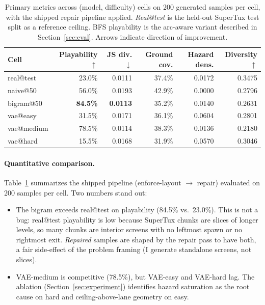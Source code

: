 \documentclass[11pt]{article}
\begin{document}
\begin{table}[h]
\centering
\small
\caption{Primary metrics across (model, difficulty) cells on 200
generated samples per cell, with the shipped repair pipeline applied.
\emph{Real@test} is the held-out SuperTux test split as a reference
ceiling. BFS playability is the arc-aware variant described in
Section~\ref{sec:eval}. Arrows indicate direction of improvement.}
\label{tab:main}
\begin{tabular}{lrrrrr}
\toprule
\textbf{Cell} & \textbf{Playability} $\uparrow$ & \textbf{JS div.} $\downarrow$ & \textbf{Ground cov.} & \textbf{Hazard dens.} & \textbf{Diversity} $\uparrow$ \\
\midrule
real@test   & 23.0\% & 0.0111 & 37.4\% & 0.0172 & 0.3475 \\
\midrule
naive@50    & 56.0\% & 0.0193 & 42.9\% & 0.0000 & 0.2796 \\
bigram@50   & \textbf{84.5\%} & \textbf{0.0113} & 35.2\% & 0.0140 & 0.2631 \\
vae@easy    & 31.5\% & 0.0171 & 36.1\% & 0.0604 & 0.2801 \\
vae@medium  & 78.5\% & 0.0114 & 38.3\% & 0.0136 & 0.2180 \\
vae@hard    & 15.5\% & 0.0168 & 31.9\% & 0.0570 & 0.3046 \\
\bottomrule
\end{tabular}
\end{table}

\paragraph{Quantitative comparison.}
Table~\ref{tab:main} summarizes the shipped pipeline (enforce-layout
$\to$ repair) evaluated on 200 samples per cell. Two numbers stand
out:
\begin{itemize}
    \item The bigram exceeds real@test on playability (84.5\% vs.\
    23.0\%). This is not a bug: real@test playability is low because
    SuperTux chunks are slices of longer levels, so many chunks are
    interior screens with no leftmost spawn or no rightmost exit.
    \emph{Repaired} samples are shaped by the repair pass to have
    both, a fair side-effect of the problem framing (I generate
    standalone screens, not slices).
    \item VAE-medium is competitive (78.5\%), but VAE-easy and
    VAE-hard lag. The ablation (Section~\ref{sec:experiment})
    identifies hazard saturation as the root cause on hard and
    ceiling-above-lane geometry on easy.
\end{itemize}
\end{document}
